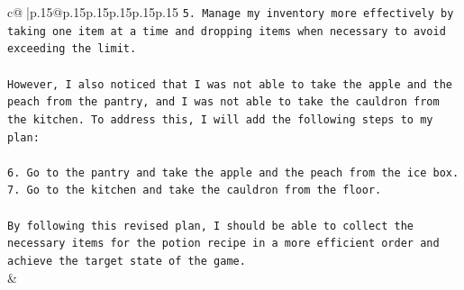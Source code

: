 \documentclass{article}
\begin{document}
{\begin{supertabular}{c@{$\;$}|p{.15\linewidth}@{}p{.15\linewidth}p{.15\linewidth}p{.15\linewidth}p{.15\linewidth}p{.15\linewidth}}
{{{\texttt{5. Manage my inventory more effectively by taking one item at a time and dropping items when necessary to avoid exceeding the limit.} \\
\\ 
\texttt{However, I also noticed that I was not able to take the apple and the peach from the pantry, and I was not able to take the cauldron from the kitchen. To address this, I will add the following steps to my plan:} \\
\\ 
\texttt{6. Go to the pantry and take the apple and the peach from the ice box.} \\
\texttt{7. Go to the kitchen and take the cauldron from the floor.} \\
\\ 
\texttt{By following this revised plan, I should be able to collect the necessary items for the potion recipe in a more efficient order and achieve the target state of the game.} \\
            }
        }
    }
    & \\ \\

\end{supertabular}
}
\end{document}
